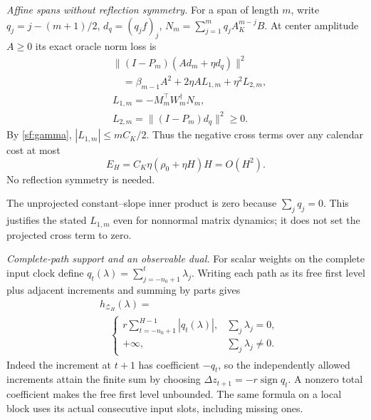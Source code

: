 \documentclass[journal]{IEEEtran}
\begin{document}
\par\smallskip\noindent\textit{Affine spans without reflection symmetry.}\enspace 
For a span of length $m$, write $q_j=j-(m+1)/2$,
$d_q=(q_jf)_j$, $N_m=\sum_{j=1}^m q_jA_K^{m-j}B$.
At center amplitude $A\ge0$ its exact oracle norm loss is
\begin{equation}\label{sf:affine}
\begin{aligned}
&\|(I-P_m)(A d_m+\eta d_q)\|^2\\
&\quad=\beta_{m-1}A^2+2\eta A L_{1,m}+\eta^2L_{2,m},\\
&L_{1,m}=-M_m^\top W_m^\dagger N_m,\\
&L_{2,m}=\|(I-P_m)d_q\|^2\ge0 .
\end{aligned}
\end{equation}
By \eqref{sf:gamma}, $|L_{1,m}|\le mC_K/2$.
Thus the negative cross terms over any calendar cost at most
\begin{equation}\label{sf:cross-budget}
E_H=C_K\eta(\rho_0+\eta H)H=O(H^2).
\end{equation}
No reflection symmetry is needed.

The unprojected constant--slope inner product is zero because
$\sum_jq_j=0$. This justifies the stated $L_{1,m}$ even for nonnormal
matrix dynamics; it does not set the projected cross term to zero.

\par\smallskip\noindent\textit{Complete-path support and an observable dual.}\enspace 
For scalar weights on the complete input clock define
$q_t(\lambda)=\sum_{j=-n_0+1}^t\lambda_j$.
Writing each path as its free first level plus adjacent increments and
summing by parts gives
\begin{equation}\label{sf:support}
\begin{aligned}
&h_{\mathcal Z_H}(\lambda)=\\
&\quad\begin{cases}r\displaystyle\sum_{t=-n_0+1}^{H-1}|q_t(\lambda)|,&\displaystyle\sum_j\lambda_j=0,\\+\infty,&\displaystyle\sum_j\lambda_j\ne0.\end{cases}
\end{aligned}
\end{equation}
Indeed the increment at $t+1$ has coefficient $-q_t$, so the independently
allowed increments attain the finite sum by choosing
$\Delta z_{t+1}=-r\operatorname{sign}q_t$. A nonzero total coefficient makes
the free first level unbounded. The same formula on a local block uses
its actual consecutive input slots, including missing ones.
\end{document}

